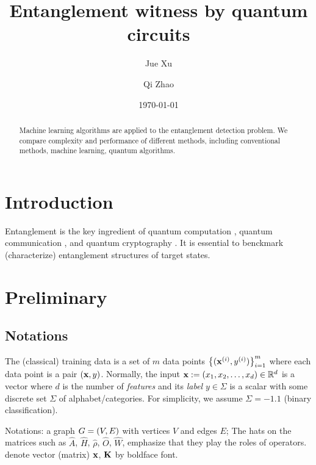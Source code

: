 \documentclass[
aps,
pra,
linenumbers,
floatfix,
]{revtex4-2}
\theoremstyle{plain}
\theoremstyle{definition}
\newcommand{\hamiltonian}{\hat{H}}
\newcommand{\ew}{\hat{W}}
\newcommand{\ob}{\hat{O}}
\newcommand{\dm}{\hat{\rho}}
\begin{document}
\title{Entanglement witness by quantum circuits}
\author{Jue Xu}
\author{Qi Zhao}
\date{\today}
\begin{abstract}
	Machine learning algorithms are applied to the entanglement detection problem.
	We compare complexity and performance of different methods, including conventional methods, machine learning, quantum algorithms.
\end{abstract}

\maketitle
 \tableofcontents

\section{Introduction}
Entanglement \cite{horodeckiQuantumEntanglement2009} is the key ingredient of quantum computation \cite{}, quantum communication \cite{}, and quantum cryptography \cite{}.
It is essential to benckmark (characterize) entanglement structures of target states.

\section{Preliminary}
\subsection{Notations}
The (classical) training data is a set of $m$ data points $\qty{(\vb{x}^{(i)}, y^{(i)})}^{m}_{i=1}$ 
where each data point is a pair $(\vb{x},y)$.
Normally, the input $\vb{x}:= (x_1,x_2,\dots,x_d) \in \mathbb{R}^d$  is a vector where $d$ is the number of \emph{features}
and its \emph{label} $y\in\Sigma$ is a scalar with some discrete set $\Sigma$ of alphabet/categories. 
For simplicity, we assume $\Sigma=\qty{-1,1}$ (binary classification).

Notations: a graph $G=(V,E)$ with vertices $V$ and edges $E$; 
The hats on the matrices such as $\hat{A}$, $\hamiltonian$, $\dm$, $\ob$, $\ew$, emphasize that they play the roles of operators.
denote vector (matrix) $\vb{x}$, $\vb{K}$ by boldface font.
\end{document}

